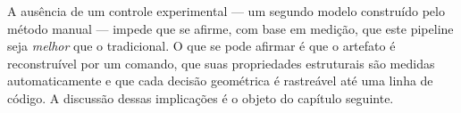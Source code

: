 A aus\^encia de um controle experimental --- um segundo modelo constru\'ido pelo
m\'etodo manual --- impede que se afirme, com base em medi{\c{c}}\~ao, que este pipeline seja
\emph{melhor} que o tradicional. O que se pode afirmar \'e que o artefato \'e reconstru\'ivel
por um comando, que suas propriedades estruturais s\~ao medidas automaticamente e que cada
decis\~ao geom\'etrica \'e rastre\'avel at\'e uma linha de c\'odigo. A
discuss\~ao dessas implica{\c{c}}\~oes \'e o objeto do cap\'itulo seguinte.
